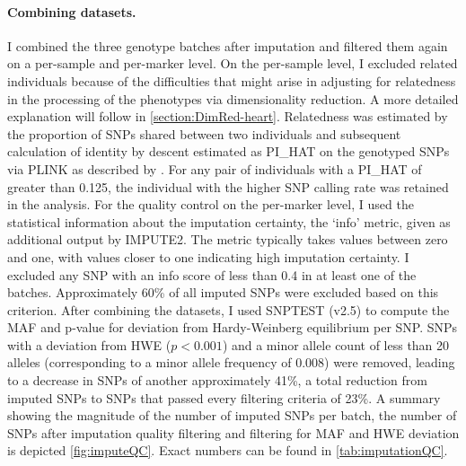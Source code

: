 \paragraph{Combining datasets.} I combined the three genotype batches after imputation and filtered them again on a per-sample and per-marker level. On the per-sample level, I excluded related individuals because of the difficulties that might arise in adjusting for relatedness in the processing of the phenotypes via dimensionality reduction. A more detailed explanation will follow in \cref{section:DimRed-heart}. Relatedness was estimated by the proportion of SNPs shared between two individuals and subsequent calculation of identity by descent estimated as PI\_HAT on the genotyped SNPs via PLINK as described by \citep{Anderson2010}. For any pair of individuals with a PI\_HAT of greater than \num{0.125}, the individual with the higher SNP calling rate was retained in the analysis. For the quality control on the per-marker level, I used the statistical information about the imputation certainty, the `info' metric,  given as additional output by IMPUTE2. The metric typically takes values between zero and one, with values closer to one indicating high imputation certainty. I excluded any SNP with an info score of less than \num{0.4} in at least one of the batches. Approximately \num{60}\% of all imputed SNPs were excluded based on this criterion.  After combining the datasets, I used SNPTEST (v2.5) \citep{Marchini2010} to  compute the MAF and p-value for deviation from Hardy-Weinberg equilibrium per SNP. SNPs with a deviation from HWE (\(p <0.001\)) and a minor allele count of less than \num{20} alleles (corresponding to a minor allele frequency of \num{0.008}) were removed, leading to a decrease in SNPs of another approximately \num{41}\%, a total reduction from imputed SNPs to SNPs that passed every filtering criteria of \num{23}\%.  A summary showing the magnitude of the number of imputed SNPs per batch, the number of SNPs after imputation quality filtering and filtering for MAF and HWE deviation is depicted \cref{fig:imputeQC}. Exact numbers can be found in \cref{tab:imputationQC}.

